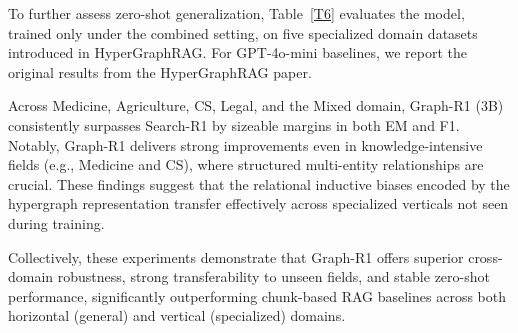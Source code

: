 \documentclass{article}
\theoremstyle{plain}
\theoremstyle{definition}
\theoremstyle{remark}
\begin{document}
To further assess zero-shot generalization, Table~\ref{T6} evaluates the model, trained only under the combined setting, on five specialized domain datasets introduced in HyperGraphRAG. For GPT-4o-mini baselines, we report the original results from the HyperGraphRAG paper.

Across Medicine, Agriculture, CS, Legal, and the Mixed domain, Graph-R1 (3B) consistently surpasses Search-R1 by sizeable margins in both EM and F1. Notably, Graph-R1 delivers strong improvements even in knowledge-intensive fields (e.g., Medicine and CS), where structured multi-entity relationships are crucial. These findings suggest that the relational inductive biases encoded by the hypergraph representation transfer effectively across specialized verticals not seen during training.

Collectively, these experiments demonstrate that Graph-R1 offers superior cross-domain robustness, strong transferability to unseen fields, and stable zero-shot performance, significantly outperforming chunk-based RAG baselines across both horizontal (general) and vertical (specialized) domains.
\clearpage





\end{document}
